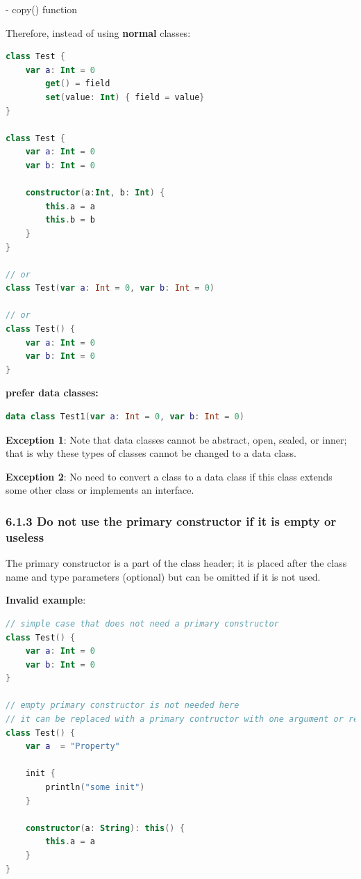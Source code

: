 - copy() function



Therefore, instead of using \textbf{normal} classes:



\begin{lstlisting}[language=Kotlin]
class Test {
    var a: Int = 0
        get() = field
        set(value: Int) { field = value}
}

class Test {
    var a: Int = 0
    var b: Int = 0
    
    constructor(a:Int, b: Int) {
        this.a = a
        this.b = b
    }
}

// or
class Test(var a: Int = 0, var b: Int = 0)
 
// or
class Test() {
    var a: Int = 0
    var b: Int = 0
}
\end{lstlisting}


\textbf{prefer data classes:}

\begin{lstlisting}[language=Kotlin]
data class Test1(var a: Int = 0, var b: Int = 0)
\end{lstlisting}


\textbf{Exception 1}: Note that data classes cannot be abstract, open, sealed, or inner; that is why these types of classes cannot be changed to a data class.



\textbf{Exception 2}: No need to convert a class to a data class if this class extends some other class or implements an interface.



\subsubsection*{\textbf{6.1.3 Do not use the primary constructor if it is empty or useless}}
\leavevmode\newline

\label{sec:6.1.3}

The primary constructor is a part of the class header; it is placed after the class name and type parameters (optional) but can be omitted if it is not used.



\textbf{Invalid example}:

\begin{lstlisting}[language=Kotlin]
// simple case that does not need a primary constructor
class Test() {
    var a: Int = 0
    var b: Int = 0
}

// empty primary constructor is not needed here
// it can be replaced with a primary contructor with one argument or removed
class Test() {
    var a  = "Property"

    init {
        println("some init")
    }

    constructor(a: String): this() {
        this.a = a
    }
}
\end{lstlisting}


